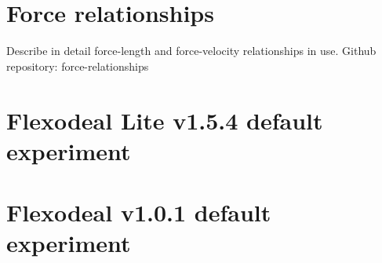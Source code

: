 \documentclass{sfuthesis}
\numberwithin{equation}{section}
\numberwithin{figure}{chapter}
\numberwithin{table}{chapter}
\theoremstyle{definition}
\begin{document}
\backmatter%
    
    

\begin{appendices} %

\chapter{Force relationships} \label{app:force_relationships}

Describe in detail force-length and force-velocity relationships in use.
Github repository: force-relationships

\chapter{Flexodeal Lite v1.5.4 default experiment} \label{app:default_flexodeal_lite}

\chapter{Flexodeal v1.0.1 default experiment} \label{app:default_flexodeal}


\end{appendices}
\end{document}
